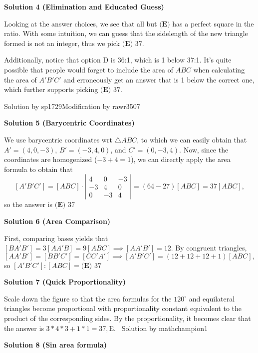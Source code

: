 \begin{enumerate}
\textbf{Solution 4 (Elimination and Educated Guess)}

Looking at the answer choices, we see that all but ${\textbf{(E)}}$ has a perfect square in the ratio. With some intuition, we can guess that the sidelength of the new triangle formed is not an integer, thus we pick $\boxed{\textbf{(E) } 37}$.

 Additionally, notice that option D is 36:1, which is 1 below 37:1. It's quite possible that people would forget to include the area of $ABC$ when calculating the area of $A'B'C'$ and erroneously get an answer that is 1 below the correct one, which further supports picking $\boxed{\textbf{(E) } 37}$.

 Solution by sp1729Modification by rawr3507

 



\textbf{Solution 5 (Barycentric Coordinates)}

We use barycentric coordinates wrt $\triangle ABC$, to which we can easily obtain that $A'=(4,0,-3)$, $B'=(-3,4,0)$, and $C'=(0,-3,4)$. Now, since the coordinates are homogenized ($-3+4=1$), we can directly apply the area formula to obtain that
 \[[A'B'C']=[ABC]\cdot\left| \begin{array}{ccc} 4 & 0 & -3 \\ -3 & 4 & 0 \\ 0 & -3 & 4 \end{array} \right| = (64-27)[ABC]=37[ABC],\]so the answer is $\boxed{\textbf{(E) } 37}$




\textbf{Solution 6 (Area Comparison)}

First, comparing bases yields that $[BA'B']=3[AA'B]=9[ABC]\implies [AA'B']=12$. By congruent triangles, 
 \[[AA'B']=[BB'C']=[CC'A']\implies [A'B'C']=(12+12+12+1)[ABC],\]so $[A'B'C']:[ABC]=\boxed{\textbf{(E) } 37}$




\textbf{Solution 7 (Quick Proportionality)}

Scale down the figure so that the area formulas for the $120^\circ$ and equilateral triangles become proportional with proportionality constant equivalent to the product of the corresponding sides. By the proportionality, it becomes clear that the answer is $3*4*3+1*1=37, \boxed{\text{E}}$.~ Solution by mathchampion1

 



\textbf{Solution 8 (Sin area formula)}


\end{enumerate}

